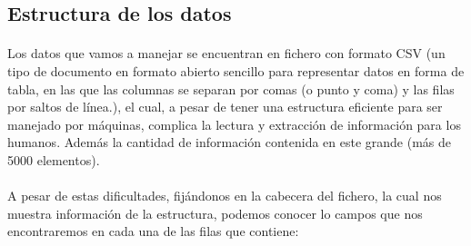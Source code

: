 \documentclass[11pt,spanish]{article}
\begin{document}
		\subsection{Estructura de los datos}

			\paragraph{}
			Los datos que vamos a manejar se encuentran en fichero con formato CSV (un tipo de documento en formato abierto sencillo para representar datos en forma de tabla, en las que las columnas se separan por comas (o punto y coma) y las filas por saltos de línea.), el cual, a pesar de tener una estructura eficiente para ser manejado por máquinas, complica la lectura y extracción de información para los humanos. Además la cantidad de información contenida en este grande (más de 5000 elementos).

			\paragraph{}
			A pesar de estas dificultades, fijándonos en la cabecera del fichero, la cual nos muestra información de la estructura, podemos conocer lo campos que nos encontraremos en cada una de las filas que contiene:
\end{document}
